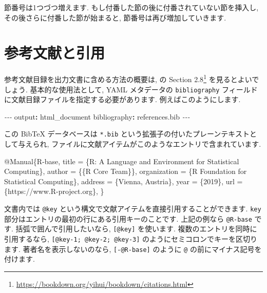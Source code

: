 \documentclass[
  11pt,
  lualatex,
  ja=standard]{bxjsreport}
\newenvironment{Shaded}{\begin{snugshade}}{\end{snugshade}}
\newcommand{\AttributeTok}[1]{\textcolor[rgb]{0.77,0.63,0.00}{#1}}
\newcommand{\DataTypeTok}[1]{\textcolor[rgb]{0.13,0.29,0.53}{#1}}
\newcommand{\FunctionTok}[1]{\textcolor[rgb]{0.00,0.00,0.00}{#1}}
\newcommand{\KeywordTok}[1]{\textcolor[rgb]{0.13,0.29,0.53}{\textbf{#1}}}
\newcommand{\NormalTok}[1]{#1}
\newcommand{\OtherTok}[1]{\textcolor[rgb]{0.56,0.35,0.01}{#1}}
\newcommand{\PreprocessorTok}[1]{\textcolor[rgb]{0.56,0.35,0.01}{\textit{#1}}}
\newcommand{\VariableTok}[1]{\textcolor[rgb]{0.00,0.00,0.00}{#1}}
\renewcommand{\href}[2]{#2\footnote{\url{#1}}}
\begin{document}
節番号は1つづつ増えます. もし付番した節の後に付番されていない節を挿入し, その後さらに付番した節が始まると, 節番号は再び増加していきます.

\hypertarget{bibliography}{%
\section{参考文献と引用}\label{bibliography}}

参考文献目録を出力文書に含める方法の概要は, \textcite{bookdown2016} の \href{https://bookdown.org/yihui/bookdown/citations.html}{Section 2.8} を見るとよいでしょう. 基本的な使用法として, YAML メタデータの \texttt{bibliography} フィールドに文献目録ファイルを指定する必要があります. 例えばこのようにします.

\begin{Shaded}
\begin{Highlighting}[]
\PreprocessorTok{{-}{-}{-}}
\FunctionTok{output}\KeywordTok{:}\AttributeTok{ html\_document}
\FunctionTok{bibliography}\KeywordTok{:}\AttributeTok{ references.bib }
\PreprocessorTok{{-}{-}{-}}
\end{Highlighting}
\end{Shaded}

この BibTeX データベースは \texttt{*.bib} という拡張子の付いたプレーンテキストとして与えられ, ファイルに文献アイテムがこのようなエントリで含まれています.

\begin{Shaded}
\begin{Highlighting}[]
\VariableTok{@Manual}\NormalTok{\{}\OtherTok{R}\NormalTok{{-}}\OtherTok{base}\NormalTok{,}
  \DataTypeTok{title}\NormalTok{ = \{R: A Language and Environment for Statistical}
\NormalTok{           Computing\},}
  \DataTypeTok{author}\NormalTok{ = \{\{R Core Team\}\},}
  \DataTypeTok{organization}\NormalTok{ = \{R Foundation for Statistical Computing\},}
  \DataTypeTok{address}\NormalTok{ = \{Vienna, Austria\},}
  \DataTypeTok{year}\NormalTok{ = \{2019\},}
  \DataTypeTok{url}\NormalTok{ = \{https://www.R{-}project.org\},}
\NormalTok{\}}
\end{Highlighting}
\end{Shaded}

文書内では \texttt{@key} という構文で文献アイテムを直接引用することができます. \texttt{key} 部分はエントリの最初の行にある引用キーのことです. 上記の例なら \texttt{@R-base} です. 括弧で囲んで引用したいなら, \texttt{{[}@key{]}} を使います. 複数のエントリを同時に引用するなら, \texttt{{[}@key-1;\ @key-2;\ @key-3{]}} のようにセミコロンでキーを区切ります. 著者名を表示しないのなら, \texttt{{[}-@R-base{]}} のように \texttt{@} の前にマイナス記号を付けます.
\end{document}
